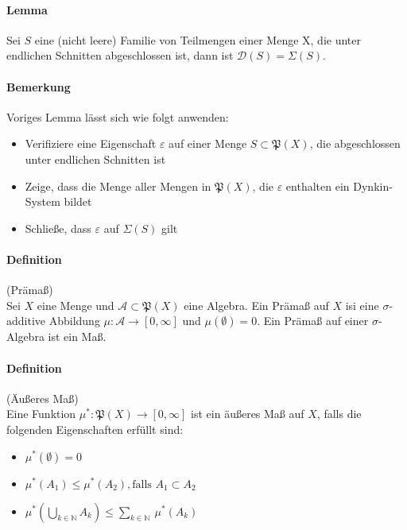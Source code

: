 \documentclass[12pt,a4paper,fleqn]{article}
\begin{document}
\paragraph{Lemma} Sei $S$ eine (nicht leere) Familie von Teilmengen einer Menge X, die unter endlichen Schnitten abgeschlossen ist, dann ist $\mathcal{D}(S) = \Sigma(S)$.

\paragraph{Bemerkung} Voriges Lemma lässt sich wie folgt anwenden:
\begin{itemize}
\item Verifiziere eine Eigenschaft $\varepsilon$ auf einer Menge $S \subset \mathfrak{P}(X)$, die abgeschlossen unter endlichen Schnitten ist
\item Zeige, dass die Menge aller Mengen in $\mathfrak{P}(X)$, die $\varepsilon$ enthalten ein Dynkin-System bildet
\item Schließe, dass $\varepsilon$ auf $\Sigma(S)$ gilt
\end{itemize} 

\paragraph{Definition} (Prämaß)\\
Sei $X$ eine Menge und $\mathcal{A} \subset \mathfrak{P}(X)$ eine Algebra. Ein Prämaß auf $X$ isi eine $\sigma$-additive Abbildung $\mu\colon\mathcal{A} \rightarrow [0, \infty]$ und $\mu(\emptyset) = 0$. Ein Prämaß auf einer $\sigma$-Algebra ist ein Maß.

\paragraph{Definition} (Äußeres Maß)\\
Eine Funktion $\mu^*\colon \mathfrak{P}(X) \rightarrow [0, \infty]$ ist ein äußeres Maß auf $X$, falls die folgenden Eigenschaften erfüllt sind:
\begin{itemize}
\item$\mu^*(\emptyset) = 0$
\item$\mu^*(A_1) \leq \mu^*(A_2), \text{falls } A_1 \subset A_2$
\item$\mu^*(\bigcup_{k \in \mathbb{N}}A_k) \leq \sum_{k \in \mathbb{N}}\ \mu^*(A_k)$
\end{itemize}
\end{document}

